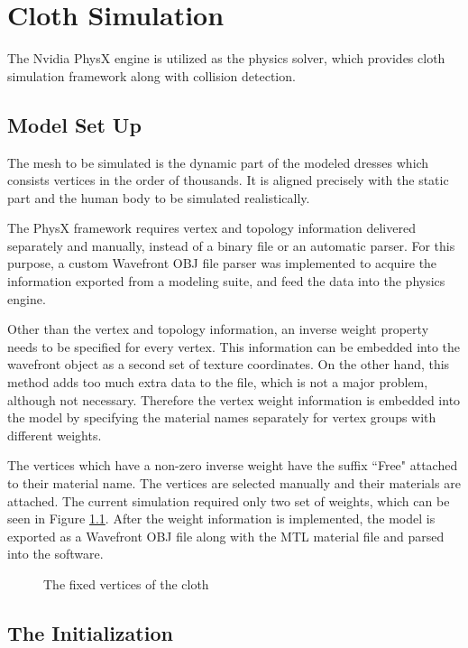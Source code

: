 \chapter{Cloth Simulation}
\label{chapter_cloth_simulation}

The Nvidia PhysX engine is utilized as the physics solver\cite{Kim2011}, which provides cloth simulation framework along with collision detection. 

\section{Model Set Up}
The mesh to be simulated is the dynamic part of the modeled dresses which consists vertices in the order of thousands. It is aligned precisely with the static part and the human body to 
be simulated realistically. 

The PhysX framework requires vertex and topology information delivered separately and manually, instead of a binary file or an automatic parser. For this purpose, a custom Wavefront OBJ
 file parser was implemented to acquire the information exported from a modeling suite, and feed the data into the physics engine. 

Other than the vertex and topology information, an inverse weight property needs to be specified for every vertex.  This information can be embedded into the wavefront object 
as a second set of texture coordinates. On the other hand, this method adds too much extra data to the file, which is not a major problem, although not necessary. 
Therefore the vertex weight information is embedded into the model by specifying the material names separately for vertex groups with different weights. 

The vertices which have a non-zero inverse weight have the suffix ``Free" attached to their material name. The vertices are selected manually and their materials are attached.
 The current simulation required only two set of weights, which can be seen in Figure \ref{fig:cloth_fixed_vertices}. After the weight information is implemented, the model
  is exported as a Wavefront OBJ file along with the MTL material file and parsed into the software.

\begin{figure}[h]
\centerline{}
\caption{The fixed vertices of the cloth}
\label{fig:cloth_fixed_vertices}
\end{figure}

\section{The Initialization}

